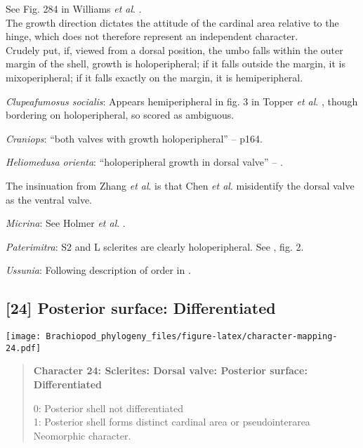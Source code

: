 \documentclass[openany]{book}
\theoremstyle{definition}
\theoremstyle{definition}
\theoremstyle{definition}
\theoremstyle{remark}
\begin{document}
See Fig. 284 in Williams \emph{et al}.
\citeyearpar{Williams1997Introduction}.\\
The growth direction dictates the attitude of the cardinal area relative
to the hinge, which does not therefore represent an independent
character.\\
Crudely put, if, viewed from a dorsal position, the umbo falls within
the outer margin of the shell, growth is holoperipheral; if it falls
outside the margin, it is mixoperipheral; if it falls exactly on the
margin, it is hemiperipheral.

\hypertarget{Clupeafumosus_socialis-coding-23}{}
\emph{Clupeafumosus socialis}: Appears hemiperipheral in fig. 3 in
Topper \emph{et al}. \citeyearpar{Topper2013Reappraisalof}, though
bordering on holoperipheral, so scored as ambiguous.

\hypertarget{Craniops-coding-23}{}
\emph{Craniops}: ``both valves with growth holoperipheral'' --
\citet{Williams2000LinguliformeaCraniiformea} p164.

\hypertarget{Heliomedusa_orienta-coding-23}{}
\emph{Heliomedusa orienta}: ``holoperipheral growth in dorsal valve'' --
\citet{Williams2007Supplement}.

The insinuation from Zhang \emph{et al}.
\citeyearpar{Zhang2009Architectureand} is that Chen \emph{et al}.
\citeyearpar{Chen2007Reinterpretationof} misidentify the dorsal valve as
the ventral valve.

\hypertarget{Micrina-coding-23}{}
\emph{Micrina}: See Holmer \emph{et al}.
\citeyearpar{Holmer2008TheEarly}.

\hypertarget{Paterimitra-coding-23}{}
\emph{Paterimitra}: S2 and L sclerites are clearly holoperipheral. See
\citet{Larsson2014iPaterimitra}, fig. 2.

\hypertarget{Ussunia-coding-23}{}
\emph{Ussunia}: Following description of order in
\citet{Williams2000LinguliformeaCraniiformea}.

\subsection*{{[}24{]} Posterior surface:
Differentiated}\label{posterior-surface-differentiated}

\texttt{[image: Brachiopod\_phylogeny\_files/figure-latex/character-mapping-24.pdf]}

\begin{quote}
\textbf{Character 24: Sclerites: Dorsal valve: Posterior surface:
Differentiated}

0: Posterior shell not differentiated\\
1: Posterior shell forms distinct cardinal area or pseudointerarea\\
Neomorphic character.
\end{quote}
\end{document}

